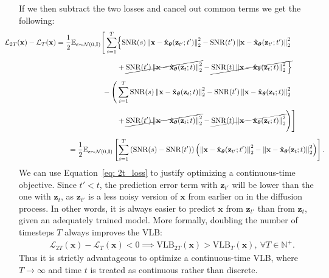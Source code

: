 %
If we then subtract the two losses and cancel out common terms we get the following:
%
\begin{align}
    \hspace{-20pt} \mathcal{L}_{2T}(\mathbf{x}) - \mathcal{L}_{T}(\mathbf{x}) = \frac{1}{2}\mathbb{E}_{\boldsymbol{\epsilon} \sim \mathcal{N}(0,\mathbf{I})}\Bigg[ \sum_{i=1}^{T} &\Big\{\mathrm{SNR}(s) \left\| \mathbf{x} - 
    \hat{\mathbf{x}}_{\boldsymbol{\theta}}(\mathbf{z}_{t'};t') \right\|^2_2 - \mathrm{SNR}(t') \left\| \mathbf{x} - \hat{\mathbf{x}}_{\boldsymbol{\theta}}(\mathbf{z}_{t'};t') \right\|^2_2 \nonumber
    \\[5pt] & + \cancel{\mathrm{SNR}(t') \left\| \mathbf{x} - \hat{\mathbf{x}}_{\boldsymbol{\theta}}(\mathbf{z}_{t};t) \right\|^2_2} - \cancel{\mathrm{SNR}(t) \left\| \mathbf{x} - \hat{\mathbf{x}}_{\boldsymbol{\theta}}(\mathbf{z}_{t};t) \right\|^2_2 \Big\}} \nonumber
    \\[5pt] & \hspace{-20pt} - \Bigg( 
    \sum_{i=1}^{T} \mathrm{SNR}(s) \left\| \mathbf{x} - \hat{\mathbf{x}}_{\boldsymbol{\theta}}(\mathbf{z}_{t};t) \right\|^2_2 - \mathrm{SNR}(t') \left\| \mathbf{x} - \hat{\mathbf{x}}_{\boldsymbol{\theta}}(\mathbf{z}_{t};t) \right\|^2_2 \nonumber
    \\[5pt] & + \cancel{\mathrm{SNR}(t') \left\| \mathbf{x} - \hat{\mathbf{x}}_{\boldsymbol{\theta}}(\mathbf{z}_{t};t) \right\|^2_2} - \cancel{\mathrm{SNR}(t) \left\| \mathbf{x} - \hat{\mathbf{x}}_{\boldsymbol{\theta}}(\mathbf{z}_{t};t) \right\|^2_2}
    \Bigg) \Bigg]
    \\[5pt] & \hspace{-67pt} = \frac{1}{2}\mathbb{E}_{\boldsymbol{\epsilon} \sim \mathcal{N}(0,\mathbf{I})}\left[
    \sum_{i=1}^T \left( \mathrm{SNR}(s) - \mathrm{SNR}(t') \right) \left(\left\| \mathbf{x} - \hat{\mathbf{x}}_{\boldsymbol{\theta}}(\mathbf{z}_{t'};t') \right\|^2_2 - \left\| \mathbf{x} - \hat{\mathbf{x}}_{\boldsymbol{\theta}}(\mathbf{z}_{t};t) \right\|^2_2 \right) \right]. \label{eq: 2t_loss}
\end{align}
%
We can use Equation~\ref{eq: 2t_loss} to justify optimizing a continuous-time objective. Since $t' < t$, the prediction error term with $\mathbf{z}_{t'}$ will be lower than the one with $\mathbf{z}_{t}$, as $\mathbf{z}_{t'}$ is a less noisy version of $\mathbf{x}$ from earlier on in the diffusion process. In other words, it is always easier to predict $\mathbf{x}$ from $\mathbf{z}_{t'}$ than from $\mathbf{z}_{t}$, given an adequately trained model. More formally, doubling the number of timesteps $T$ always improves the VLB:
%
\begin{align}
    \mathcal{L}_{2T}(\mathbf{x}) - \mathcal{L}_{T}(\mathbf{x}) < 0 \implies \mathrm{VLB}_{2T}(\mathbf{x}) > \mathrm{VLB}_{T}(\mathbf{x}), \ \forall T \in \mathbb{N}^{+}.
\end{align}
%
Thus it is strictly advantageous to optimize a continuous-time VLB, where $T \rightarrow \infty$ and time $t$ is treated as continuous rather than discrete.
%

